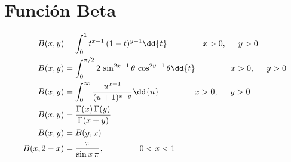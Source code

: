\endgroup
\section{Función Beta}
\begin{align*}
B (x, y) &= \int_{0}^{1} t^{x - 1} \, (1 - t)^{y-1} \dd{t} \hspace{1.5cm} x > 0, \hspace{0.5cm} y > 0 \\
B (x, y) &= \int_{0}^{\pi/2} 2 \, \sin^{2 x - 1} \theta \, \cos^{2 y - 1} \theta \dd{t} \hspace{1.5cm} x > 0, \hspace{0.5cm} y > 0 \\
B (x, y) &= \int_{0}^{\infty} \dfrac{u^{x-1}}{(u + 1)^{x+y}} \dd{u} \hspace{1.5cm} x > 0, \hspace{0.5cm} y > 0 \\
B (x, y) &= \dfrac{\Gamma (x) \, \Gamma (y)}{\Gamma (x + y)} \\
B (x, y) &= B (y, x) \\
B (x, 2-x) &= \dfrac{\pi}{\sin x \, \pi}, \hspace{1.5cm} 0 < x < 1
\end{align*}

